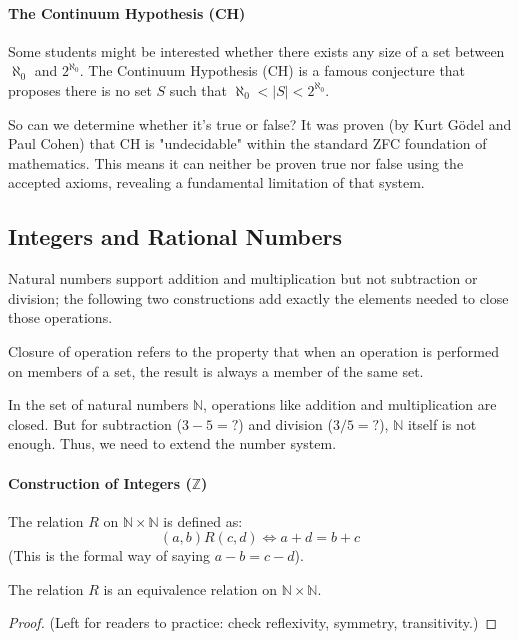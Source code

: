 \paragraph{The Continuum Hypothesis (CH)}
Some students might be interested whether there exists any size of a set between $\aleph_0$ and $2^{\aleph_0}$. The Continuum Hypothesis (CH) is a famous conjecture that proposes there is no set $S$ such that $\aleph_0 < |S| < 2^{\aleph_0}$.

So can we determine whether it’s true or false? It was proven (by Kurt Gödel and Paul Cohen) that CH is "undecidable" within the standard ZFC foundation of mathematics. This means it can neither be proven true nor false using the accepted axioms, revealing a fundamental limitation of that system.

\subsection{Integers and Rational Numbers}
Natural numbers support addition and multiplication but not subtraction or division; the following two constructions add exactly the elements needed to close those operations.
\begin{definition}
Closure of operation refers to the property that when an operation is performed on members of a set, the result is always a member of the same set.
\end{definition}
In the set of natural numbers $\mathbb{N}$, operations like addition and multiplication are closed. But for subtraction ($3 - 5 = ?$) and division ($3 / 5 = ?$), $\mathbb{N}$ itself is not enough. Thus, we need to extend the number system.

\paragraph{Construction of Integers ($\mathbb{Z}$)}
\begin{definition}
The relation $R$ on $\mathbb{N} \times \mathbb{N}$ is defined as:
$$ (a,b) R (c,d) \iff a+d = b+c $$
(This is the formal way of saying $a-b = c-d$).
\end{definition}

\begin{theorem}
The relation $R$ is an equivalence relation on $\mathbb{N} \times \mathbb{N}$.
\end{theorem}
\begin{proof}
(Left for readers to practice: check reflexivity, symmetry, transitivity.)
\end{proof}


